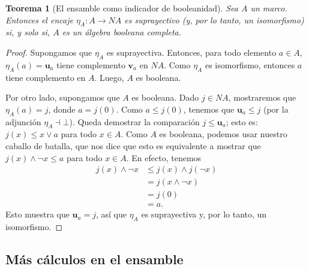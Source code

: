\documentclass[12pt,letterpaper,titlepage]{article}
\newtheorem{thm}{Teorema}
\theoremstyle{definition}
\renewcommand\sup{\vee}
\renewcommand\inf{\wedge}
\newcommand\unuc[1]{\mathbf u_{#1}}
\newcommand\vnuc[1]{\mathbf v_{#1}}
\newcommand\<{\langle}
\renewcommand\>{\rangle}
\begin{document}
\begin{thm}[El ensamble como indicador de booleanidad]
  Sea $A$ un marco.
  Entonces el encaje $\eta_A:A\to NA$ es suprayectivo (y, por lo
  tanto, un isomorfismo) si, y solo
  si, $A$ es un álgebra booleana completa.
\end{thm}
\begin{proof}
    Supongamos que $\eta_A$ es suprayectiva.
    Entonces, para todo elemento $a\in A$,
    $\eta_A(a)=\unuc a$ tiene complemento $\vnuc a$ en $NA$.
    Como $\eta_A$ es isomorfismo, entonces
    $a$ tiene complemento en $A$.
    Luego, $A$ es booleana.
    
    Por otro lado, supongamos que $A$ es booleana.
    Dado $j\in NA$, mostraremos que $\eta_A(a)=j$,
    donde $a=j(0)$.
    Como $a\leq j(0)$, tenemos que $\unuc a\leq j$
    (por la adjunción $\eta_A\dashv\bot$).
    Queda demostrar la comparación $j\leq\unuc a$;
    esto es: $j(x)\leq x\sup a$ para todo $x\in A$.
    Como $A$ es booleana, podemos usar nuestro
    caballo de batalla, que nos dice que esto es equivalente
    a mostrar que $j(x)\inf\neg x\leq a$ para todo $x\in A$.
    En efecto, tenemos
    \begin{align*}
        j(x)\inf\neg x
        &\leq j(x)\inf j(\neg x) \\
        &= j(x\inf\neg x) \\
        &= j(0) \\
        &= a.
    \end{align*}
    Esto muestra que $\unuc a=j$,
    así que $\eta_A$ es suprayectiva y,
    por lo tanto, un isomorfismo.
\end{proof}

\subsection{Más cálculos en el ensamble}
\label{ssec:calculos}
\end{document}
